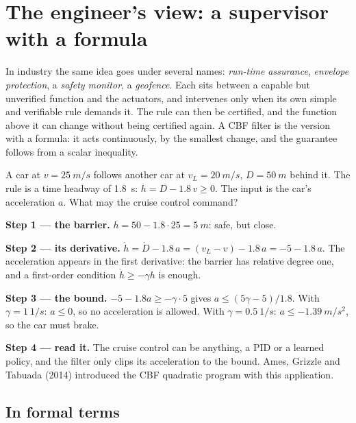 \section{The engineer's view: a supervisor with a formula}

In industry the same idea goes under several names: \emph{run-time assurance}, \emph{envelope protection}, a \emph{safety monitor}, a \emph{geofence}. Each sits between a capable but unverified function and the actuators, and intervenes only when its own simple and verifiable rule demands it. The rule can then be certified, and the function above it can change without being certified again. A CBF filter is the version with a formula: it acts continuously, by the smallest change, and the guarantee follows from a scalar inequality.

\begin{example}
\label{ex:cbf-acc}
A car at $v = \SI{25}{m/s}$ follows another car at $v_L = \SI{20}{m/s}$, $D = \SI{50}{m}$ behind it. The rule is a time headway of \SI{1.8}{s}: $h = D - 1.8\,v \ge 0$. The input is the car's acceleration $a$. What may the cruise control command?

\textbf{Step 1 — the barrier.} $h = 50 - 1.8 \cdot 25 = \SI{5}{m}$: safe, but close.

\textbf{Step 2 — its derivative.} $\dot h = \dot D - 1.8\,a = (v_L - v) - 1.8\,a = -5 - 1.8\,a$. The acceleration appears in the first derivative: the barrier has relative degree one, and a first-order condition $\dot h \ge -\gamma h$ is enough.

\textbf{Step 3 — the bound.} $-5 - 1.8a \ge -\gamma \cdot 5$ gives $a \le (5\gamma - 5)/1.8$. With $\gamma = \SI{1}{1/s}$: $a \le 0$, so no acceleration is allowed. With $\gamma = \SI{0.5}{1/s}$: $a \le \SI{-1.39}{m/s^2}$, so the car must brake.

\textbf{Step 4 — read it.} The cruise control can be anything, a PID or a learned policy, and the filter only clips its acceleration to the bound. Ames, Grizzle and Tabuada (2014) introduced the CBF quadratic program with this application.
\end{example}

\subsection{In formal terms}

